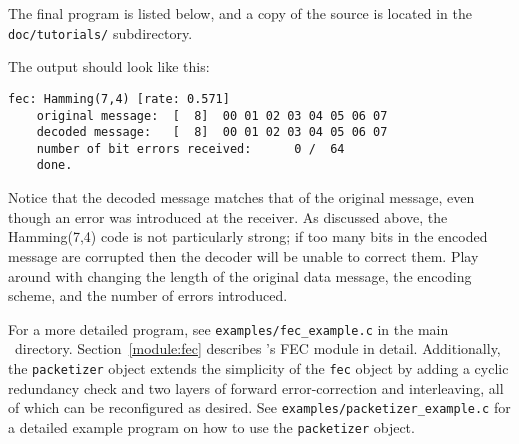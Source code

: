 The final program is listed below,
and a copy of the source is located in the {\tt doc/tutorials/}
subdirectory.
%

%
The output should look like this:
%
\begin{Verbatim}[fontsize=\small]
    fec: Hamming(7,4) [rate: 0.571]
    original message:  [  8]  00 01 02 03 04 05 06 07
    decoded message:   [  8]  00 01 02 03 04 05 06 07
    number of bit errors received:      0 /  64
    done.
\end{Verbatim}
%
Notice that the decoded message matches that of the original message,
even though an error was introduced at the receiver.
As discussed above, the Hamming(7,4) code is not particularly strong;
if too many bits in the encoded message are corrupted then the decoder
will be unable to correct them.
Play around with changing the length of the original data message,
the encoding scheme, and the number of errors introduced.

For a more detailed program, see {\tt examples/fec\_example.c} in the
main \liquid\ directory.
Section~\ref{module:fec} describes \liquid's FEC module in detail.
Additionally, the {\tt packetizer} object extends the simplicity of the
{\tt fec} object by adding a cyclic redundancy check and two layers of
forward error-correction and interleaving, all of which can be
reconfigured as desired.
See {\tt examples/packetizer\_example.c} for a detailed example program
on how to use the {\tt packetizer} object.

